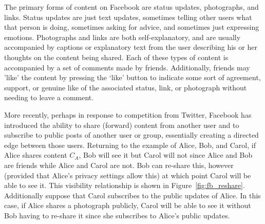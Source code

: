 The primary forms of content on Facebook are status updates, photographs, and links. Status updates are just text updates, sometimes telling other users what that person is doing, sometimes asking for advice, and sometimes just expressing emotions. Photographs and links are both self-explanatory, and are usually accompanied by captions or explanatory text from the user describing his or her thoughts on the content being shared. Each of these types of content is accompanied by a set of comments made by friends. Additionally, friends may 'like' the content by pressing the `like' button to indicate some sort of agreement, support, or genuine like of the associated status, link, or photograph without needing to leave a comment.

More recently, perhaps in response to competition from Twitter, Facebook has introduced the ability to share (forward) content from another user and to subscribe to public posts of another user or group, essentially creating a directed edge between those users. Returning to the example of Alice, Bob, and Carol, if Alice shares content $C_{A}$, Bob will see it but Carol will not since Alice and Bob are friends while Alice and Carol are not. Bob can re-share this, however (provided that Alice's privacy settings allow this) at which point Carol will be able to see it. This visibility relationship is shown in Figure~\ref{fig:fb_reshare}. Additionally suppose that Carol subscribes to the public updates of Alice. In this case, if Alice shares a photograph publicly, Carol will be able to see it without Bob having to re-share it since she subscribes to Alice's public updates. 

